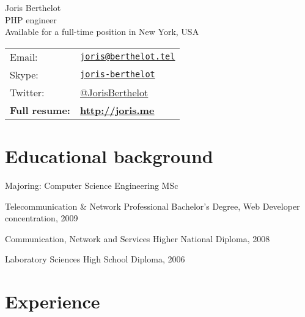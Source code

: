 \documentclass[letterpaper]{article}
\def\name{Joris Berthelot}
\def\title{PHP engineer\\\large{Available for a full-time position in New York, USA}}
\renewenvironment{itemize}{
    \begin{list}{}{
        \setlength{\leftmargin}{1.5em}
    }
}{
    \end{list}
}
\begin{document}
    
    
    \vspace{0.25in}
    
    \begin{minipage}{0.65\linewidth}
        {\Huge \name} \\
        {\Large \title}
    \end{minipage}
    \begin{minipage}{\linewidth}
        \begin{tabular}{ll}
            Email: & \href{mailto:joris@berthelot.tel}{\tt joris@berthelot.tel} \\
            Skype: %
                   & \href{skype:joris-berthelot?add}{\tt joris-berthelot} \\
            Twitter: & \href{http://twitter.com/JorisBerthelot}{@JorisBerthelot} \\
            \textbf{\textcolor{BrickRed}{Full resume:}} & \textbf{\href{http://joris.me}{\uline{http://joris.me}}}
        \end{tabular}
    \end{minipage}
    
    \section*{Educational background}
        
        \begin{itemize}
            \item Majoring: Computer Science Engineering MSc
            \item Telecommunication \& Network Professional Bachelor's Degree, Web Developer concentration, 2009
            \item Communication, Network and Services Higher National Diploma, 2008
            \item Laboratory Sciences High School Diploma, 2006
        \end{itemize}
        
    \section*{Experience}
        
\end{document}
